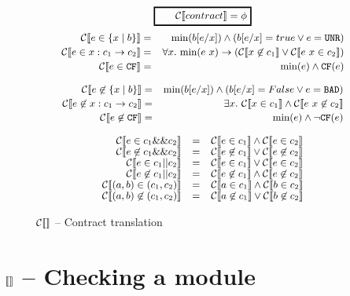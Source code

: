 \documentclass[preprint]{sigplanconf}
\begin{document}
\begin{figure}
  $$ \ruleform{\ctrans{contract} = \phi} $$
\begin{eqnarray*}
  \ctrans{e \in \{x \mid b \}} &=&  \min{b[e/x]} \land (b[e/x] = true \lor e = \unr)\\
  \ctrans{e \in x:c_1 \to c_2} &=& \forall x.~\min{e~x} \to (\ctrans{x \not \in c_1} \lor  \ctrans{e~x \in c_2})\\
  \ctrans{e \in \cfc} &=& \min{e} \land \cf{e}
\end{eqnarray*}

\begin{eqnarray*}
  \ctrans{e \not \in \{x \mid b \}} &=&  \min{b[e/x]} \land (b[e/x] = \false \lor e = \bad)\\
  \ctrans{e \not \in x:c_1 \to c_2} &=& \exists x.~ \ctrans{x \in c_1} \land  \ctrans{e~x \not \in c_2}\\
  \ctrans{e \not \in \cfc} &=& \min{e} \land \lnot \cf{e}
\end{eqnarray*}

\begin{center}
\[  \begin{array}{rcl}
 \ctrans{e \in c_1 \&\& c_2} &=& \ctrans{e \in c_1} \land \ctrans{e \in c_2} \\
 \ctrans{e \not \in c_1 \&\& c_2} &=& \ctrans{e \not \in c_1} \lor \ctrans{e \not \in c_2}\\
 \ctrans{e \in c_1 || c_2} &=& \ctrans{e \in c_1} \lor \ctrans{e \in c_2} \\
  \ctrans{e \not \in c_1 || c_2} &=& \ctrans{e \not \in c_1} \land \ctrans{e \not \in c_2}\\
 \ctrans{(a,b) \in (c_1,c_2)}   &=& \ctrans{a \in c_1} \land \ctrans{b \in c_2} \\
 \ctrans{(a,b) \not \in (c_1,c_2)}   &=& \ctrans{a \not \in c_1} \lor \ctrans{b \not \in c_2} \\
\end{array} \]
\end{center}

\caption{$\ctrans{}$ -- Contract translation}
\label{ctrans}
\end{figure}

\section{$\trans{}$ -- Checking a module}
\end{document}

